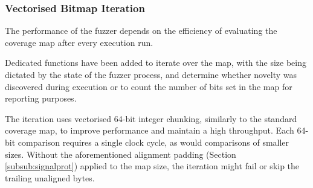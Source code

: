 
\subsubsection{Vectorised Bitmap Iteration}

The performance of the fuzzer depends on the efficiency of evaluating the coverage map after every execution run.

Dedicated functions have been added to iterate over the map, with the size being dictated by the state of the fuzzer process, and determine whether novelty was discovered during execution or to count the number of bits set in the map for reporting purposes.

The iteration uses vectorised 64-bit integer chunking, similarly to the standard coverage map, to improve performance and maintain a high throughput. Each 64-bit comparison requires a single clock cycle, as would comparisons of smaller sizes. Without the aforementioned alignment padding (Section \ref{subsub:signalprot}) applied to the map size, the iteration might fail or skip the trailing unaligned bytes.